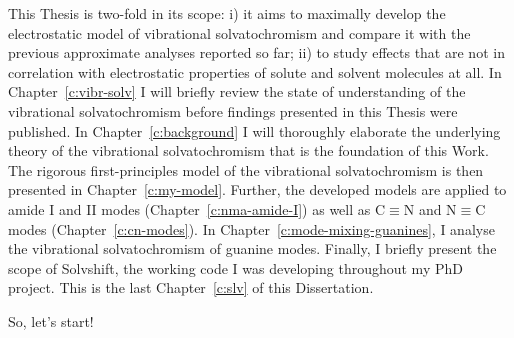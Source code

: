 \documentclass[a4paper,titlepage,twoside,fleqn,12pt]{book}
\begin{document}
\begin{refsection}
This Thesis is two\hyp{}fold in its scope: i) it aims to maximally develop
the electrostatic model of vibrational solvatochromism and compare it
with the previous approximate analyses reported so far; ii) to
study effects that are not in correlation with electrostatic properties
of solute and solvent molecules at all. In Chapter~\ref{c:vibr-solv} I will 
briefly review the state of understanding of the vibrational solvatochromism
before findings presented in this Thesis were published. In Chapter~\ref{c:background}
I will thoroughly elaborate the underlying theory of the vibrational
solvatochromism that is the foundation of this Work. The rigorous first\hyp{}principles
model of the vibrational solvatochromism is then presented in Chapter~\ref{c:my-model}.
Further, the developed models are applied to amide I and II modes (Chapter~\ref{c:nma-amide-I})
as well as
C$\equiv$N and N$\equiv$C modes (Chapter~\ref{c:cn-modes}). In Chapter~\ref{c:mode-mixing-guanines},
I analyse the vibrational solvatochromism of guanine modes. Finally,
I briefly present the scope of {\sc Solvshift}, the working code I was developing throughout
my PhD project. This is the last Chapter~\ref{c:slv} of this Dissertation.


So, let's start!

\printbibliography[heading=subbibintoc,title={References}]
\end{refsection}
\end{document}
